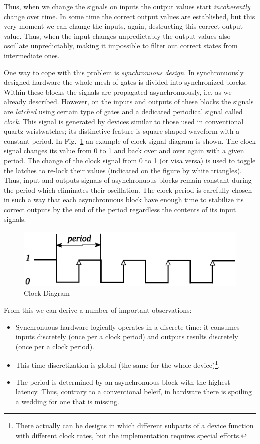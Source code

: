 Thus, when we change the signals on inputs the output values start \emph{incoherently} change over time. In some time
the correct output values are established, but this very moment we can change the inputs, again, destructing this correct
output value. Thus, when the input changes unpredictably the output values also oscillate unpredictably, making it
impossible to filter out correct states from intermediate ones.

One way to cope with this problem is \emph{synchronuous design}. In synchronuously designed hardware the whole
mesh of gates is divided into synchronized blocks. Within these blocks the signals are propagated asynchronuously, i.e.
as we already described. However, on the inputs and outputs of these blocks the signals are \emph{latched}
using certain type of gates and a dedicated periodical signal called \emph{clock}. This signal is generated by devices
similar to those used in conventional quartz wristwatches; its distinctive feature is square-shaped waveform with
a constant period. In Fig.~\ref{clock-diagram} an example of clock signal diagram is shown. The clock signal changes
its value from 0 to 1 and back over and over again with a given period. The change of the clock signal from 0 to 1 (or visa versa)
is used to toggle the latches to re-lock their values (indicated on the figure by white triangles). Thus, input and outputs
signals of asynchronuous blocks remain constant during the period which eliminates their oscillation. The clock period is carefully
chosen in such a way that each asynchronuous block have enough time to stabilize its correct outputs by the end of the period
regardless the contents of its input signals. 

\begin{figure}[t]
  \centering
  \includegraphics[scale=0.7]{images/06-10.eps}
  \caption{Clock Diagram}
  \label{clock-diagram}
\end{figure}

From this we can derive a number of important observations:

\begin{itemize}
\item Synchronuous hardware logically operates in a discrete time: it consumes inputs discretely (once per a clock period) and
  outputs results discretely (once per a clock period).
\item This time discretization is global (the same for the whole device)\footnote{There actually can be designs in which different
subparts of a device function with different clock rates, but the implementation requires special efforts.}.
\item The period is determined by an asynchronuous block with the highest latency. Thus, contrary to a conventional beleif, in hardware
there is spoiling a wedding for one that is missing.
\end{itemize}

